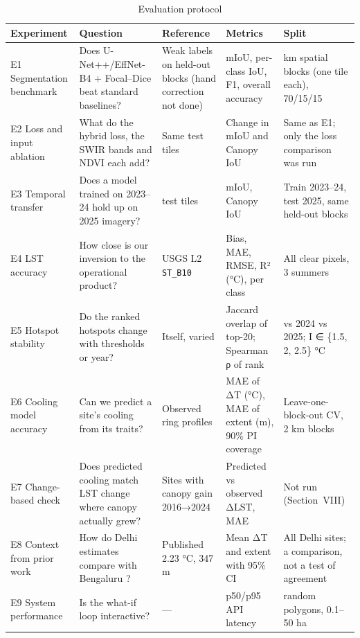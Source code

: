 \documentclass[conference]{IEEEtran}
\begin{document}
\begin{table}[!t]
\centering\footnotesize
\caption{Evaluation protocol}
\label{tab:4}
\renewcommand{\arraystretch}{1.15}
\begin{tabularx}{\textwidth}{>{\raggedright\arraybackslash}X>{\raggedright\arraybackslash}X>{\raggedright\arraybackslash}X>{\raggedright\arraybackslash}X>{\raggedright\arraybackslash}X}
\toprule
\textbf{Experiment} & \textbf{Question} & \textbf{Reference} & \textbf{Metrics} & \textbf{Split} \\
\midrule
E1 Segmentation benchmark & Does U-Net++/\allowbreak{}EffNet-B4 + Focal--Dice beat standard baselines? & Weak labels on held-out blocks (hand correction not done) & mIoU, per-class IoU, F1, overall accuracy & 2.56 km spatial blocks (one tile each), 70/\allowbreak{}15/\allowbreak{}15 \\
E2 Loss and input ablation & What do the hybrid loss, the SWIR bands and NDVI each add? & Same test tiles & Change in mIoU and Canopy IoU & Same as E1; only the loss comparison was run \\
E3 Temporal transfer & Does a model trained on 2023--24 hold up on 2025 imagery? & 2025 test tiles & mIoU, Canopy IoU & Train 2023--24, test 2025, same held-out blocks \\
E4 LST accuracy & How close is our inversion to the operational product? & USGS L2 \texttt{ST\_\allowbreak{}B10} & Bias, MAE, RMSE, R² (°C), per class & All clear pixels, 3 summers \\
E5 Hotspot stability & Do the ranked hotspots change with thresholds or year? & Itself, varied & Jaccard overlap of top-20; Spearman ρ of rank & 2023 vs 2024 vs 2025; I ∈ \{1.5, 2, 2.5\} °C \\
E6 Cooling model accuracy & Can we predict a site's cooling from its traits? & Observed ring profiles & MAE of ΔT (°C), MAE of extent (m), 90\% PI coverage & Leave-one-block-out CV, 2 km blocks \\
E7 Change-based check & Does predicted cooling match LST change where canopy actually grew? & Sites with canopy gain 2016→2024 & Predicted vs observed ΔLST, MAE & Not run (Section~VIII) \\
E8 Context from prior work & How do Delhi estimates compare with Bengaluru \cite{b3}? & Published 2.23 °C, 347 m & Mean ΔT and extent with 95\% CI & All Delhi sites; a comparison, not a test of agreement \\
E9 System performance & Is the what-if loop interactive? & --- & p50/\allowbreak{}p95 API latency & 1000 random polygons, 0.1--50 ha \\
\bottomrule
\end{tabularx}
\end{table}
\end{document}
